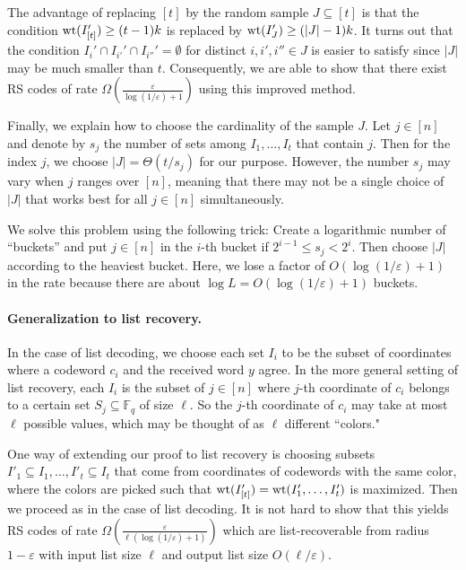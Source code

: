 \documentclass[11pt]{article}
\renewcommand{\epsilon}{\varepsilon}
\newcommand{\wt}{{\rm wt}}
\begin{document}
The advantage of replacing $[t]$ by the random sample $J\subseteq [t]$ is that the condition $\wt(I'_{[t]})\geq (t-1)k$
is replaced by $\wt(I'_{J})\geq (|J|-1)k$. It turns out that the condition $I_i'\cap I_{i'}'\cap I_{i''}'=\emptyset$ for distinct $i,i',i''\in J$ is easier to satisfy since  $|J|$ may be much smaller than $t$.
Consequently, we are able to show that there exist RS codes of rate $\Omega(\frac{\epsilon}{\log(1/\epsilon)+1})$ using this improved method.

Finally, we explain how to choose the cardinality of the sample $J$.
Let $j\in [n]$ and denote by $s_j$ the number of sets among $I_1,\dots, I_t$ that contain  $j$.
Then for the index $j$, we choose $|J|=\Theta(t/s_j)$ for our purpose.
However, the number $s_j$ may vary  when $j$ ranges over $[n]$, meaning that there may not be a single choice of $|J|$ that works best for all $j\in [n]$ simultaneously.

We solve this problem using the following trick: Create a logarithmic number of ``buckets'' and put $j\in [n]$ in the $i$-th bucket if $2^{i-1} \leq s_j<2^i$. Then choose $|J|$ according to the heaviest bucket. Here, we lose a factor of $O(\log(1/\epsilon)+1)$ in the rate because there are about $\log L = O(\log(1/\epsilon)+1)$ buckets.

\paragraph{Generalization to list recovery.} In the case of list decoding, we choose each set $I_i$ to be the subset of coordinates where a codeword $c_i$ and the received word $y$ agree.  In the more general setting of list recovery, each $I_i$ is the subset of $j\in [n]$ where $j$-th coordinate of $c_i$ belongs to a certain set $S_j\subseteq \mathbb{F}_q$ of size $\ell$.
So the $j$-th coordinate of $c_i$ may take at most $\ell$ possible values, which may be thought of as $\ell$ different ``colors."

One way of extending our proof to list recovery is choosing subsets $I'_1\subseteq I_1,\dots,I'_t\subseteq I_t$ that come from coordinates of codewords with the same color, where the colors are picked such that $\wt(I'_{[t]})=\wt(I'_1,\dots, I'_t)$ is maximized. Then we proceed as in the case of list decoding.
It is not hard to show that this yields RS codes of rate $\Omega(\frac{\epsilon}{\ell(\log(1/\epsilon)+1)})$ which are list-recoverable from radius $1-\epsilon$ with input list size $\ell$ and output list size $O(\ell/\epsilon)$.
\end{document}
